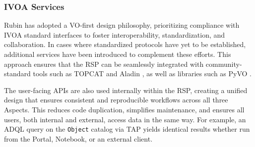 \subsubsection{IVOA Services}
\label{sssec:ivoa_services}

Rubin has adopted a \gls{VO}-first design philosophy, prioritizing compliance with \gls{IVOA} standard interfaces to foster interoperability, standardization, and collaboration.
In cases where standardized protocols have yet to be established, additional services have been introduced to complement these efforts.
This approach ensures that the RSP can be seamlessly integrated with community-standard tools such as \gls{TOPCAT} \citep[][]{2011ascl.soft01010T} and Aladin \citep[][]{2000A&AS..143...33B, 2014ASPC..485..277B, 2022ASPC..532....7B}, as well as libraries such as  PyVO \citep[][]{2014ascl.soft02004G}.

The user-facing \glspl{API} are also used internally within the \gls{RSP}, creating a unified design that ensures consistent and reproducible workflows across all three Aspects.
This reduces code duplication, simplifies maintenance, and ensures all users, both internal and external, access data in the same way.
For example, an \gls{ADQL} query on the \texttt{Object} catalog via TAP yields identical results whether run from the Portal, Notebook, or an external client.

